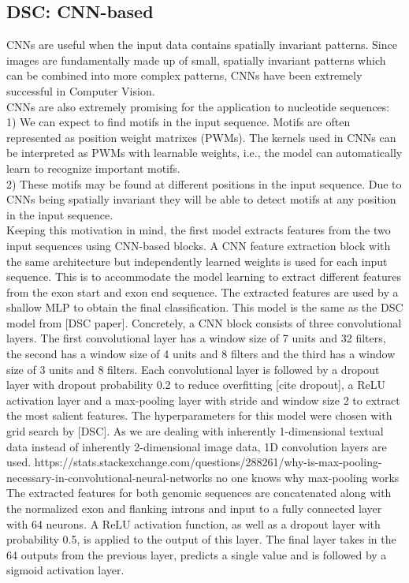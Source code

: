 \subsection{DSC: CNN-based} \label{subsec:dsc}
CNNs are useful when the input data contains spatially invariant patterns. Since images are fundamentally made up of small, spatially invariant patterns which can be combined into more complex patterns, CNNs have been extremely successful in Computer Vision.\\
CNNs are also extremely promising for the application to nucleotide sequences: \\
1) We can expect to find motifs in the input sequence. Motifs are often represented as position weight matrixes (PWMs). The kernels used in CNNs can be interpreted as PWMs with learnable weights, i.e., the model can automatically learn to recognize important motifs.\\
2) These motifs may be found at different positions in the input sequence. Due to CNNs being spatially invariant they will be able to detect motifs at any position in the input sequence. \\
Keeping this motivation in mind, the first model extracts features from the two input sequences using CNN-based blocks. A CNN feature extraction block with the same architecture but independently learned weights is used for each input sequence. This is to accommodate the model learning to extract different features from the exon start and exon end sequence. The extracted features are used by a shallow MLP to obtain the final classification. This model is the same as the DSC model from [DSC paper].
Concretely, a CNN block consists of three convolutional layers. The first convolutional layer has a window size of 7 units and 32 filters, the second has a window size of 4 units and 8 filters and the third has a window size of 3 units and 8 filters. Each convolutional layer is followed by a dropout layer with dropout probability 0.2 to reduce overfitting [cite dropout], a ReLU activation layer and a max-pooling layer with stride and window size 2 to extract the most salient features. The hyperparameters for this model were chosen with grid search by [DSC]. As we are dealing with inherently 1-dimensional textual data instead of inherently 2-dimensional image data, 1D convolution layers are used.
https://stats.stackexchange.com/questions/288261/why-is-max-pooling-necessary-in-convolutional-neural-networks
no one knows why max-pooling works
The extracted features for both genomic sequences are concatenated along with the normalized exon and flanking introns and input to a fully connected layer with 64 neurons. A ReLU activation function, as well as a dropout layer with probability 0.5, is applied to the output of this layer. The final layer takes in the 64 outputs from the previous layer, predicts a single value and is followed by a sigmoid activation layer.
